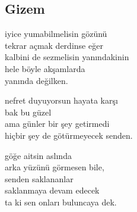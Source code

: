 \subsection{Gizem}

iyice yumabilmelisin gözünü \\
tekrar açmak derdinse eğer \\
kalbini de sezmelisin yanındakinin \\
hele böyle akşamlarda \\
yanında değilken.

\noindent\newline
nefret duyuyorsun hayata karşı \\
bak bu güzel \\
ama günler bir şey getirmedi \\
hiçbir şey de götürmeyecek senden.

\noindent\newline
göğe aitsin aslında \\
arka yüzünü görmesen bile, \\
senden saklananlar \\
saklanmaya devam edecek \\
ta ki sen onları buluncaya dek.